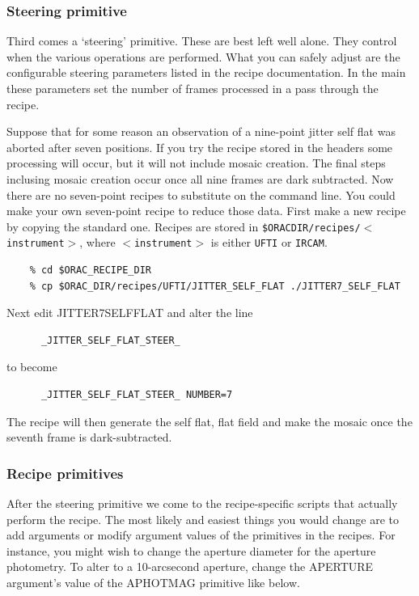 \documentclass[twoside,11pt]{article}
\newcommand{\xlabel}[1]{}
\renewcommand{\_}{\texttt{\symbol{95}}}
\begin{document}
\subsubsection{\xlabel{steering_primitive}Steering
primitive\label{steering_primitive}}

Third comes a `steering' primitive.  These are best left well alone.
They control when the various operations are performed.  What you can
safely adjust are the configurable steering parameters listed in the
recipe documentation.  In the main these parameters set the number of
frames processed in a pass through the recipe. 

Suppose that for some reason an observation of a nine-point jitter
self flat was aborted after seven positions.  If you try the recipe
stored in the headers some processing will occur, but it will not
include mosaic creation.  The final steps inclusing mosaic creation
occur once all nine frames are dark subtracted.  Now there are no
seven-point recipes to substitute on the command line.  You could make
your own seven-point recipe to reduce those data.  First make a new
recipe by copying the standard one.  Recipes are stored in
{\tt\$ORAC\_DIR/recipes/$<$instrument$>$}, where {\tt$<$instrument$>$} is
either {\tt UFTI} or {\tt IRCAM}.

\begin{verbatim}
    % cd $ORAC_RECIPE_DIR
    % cp $ORAC_DIR/recipes/UFTI/JITTER_SELF_FLAT ./JITTER7_SELF_FLAT
\end{verbatim}
Next edit JITTER7\_SELF\_FLAT and alter the line

\begin{verbatim}
      _JITTER_SELF_FLAT_STEER_
\end{verbatim}
to become

\begin{verbatim}
      _JITTER_SELF_FLAT_STEER_ NUMBER=7
\end{verbatim}
The recipe will then generate the self flat, flat field and make the
mosaic once the seventh frame is dark-subtracted.

\subsubsection{\xlabel{recipe_primitives}Recipe primitives\label{recipe_primitives}}

After the steering primitive we come to the recipe-specific scripts
that actually perform the recipe.  The most likely and easiest things
you would change are to add arguments or modify argument values of the
primitives in the recipes.  For instance, you might wish to change the
aperture diameter for the aperture photometry.  To alter to a
10-arcsecond aperture, change the APERTURE argument's value of the
\_APHOT\_MAG\_ primitive like below.
\end{document}
